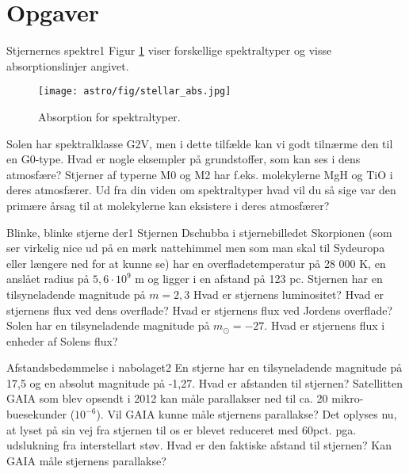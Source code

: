 \section{Opgaver}

\begin{opgave}{Stjernernes spektre}{1}
  Figur \ref{fig:stellar_abs} viser forskellige spektraltyper og visse
  absorptionslinjer angivet.
\begin{figure}[h]
	\centering
	\texttt{[image: astro/fig/stellar\_abs.jpg]}
	\caption{Absorption for spektraltyper.}
	\label{fig:stellar_abs}
\end{figure}
\opg Solen har spektralklasse G2V, men i dette tilfælde kan vi godt
tilnærme den til en G0-type. Hvad er nogle eksempler på grundstoffer,
som kan ses i dens atmosfære?  \opg Stjerner af typerne M0 og M2 har
f.eks. molekylerne MgH og TiO i deres atmosfærer. Ud fra din viden om
spektraltyper hvad vil du så sige var den primære årsag til at
molekylerne kan eksistere i deres atmosfærer?
\end{opgave}

\begin{opgave}{Blinke, blinke stjerne der}{1}
  Stjernen Dschubba i stjernebilledet Skorpionen (som ser virkelig
  nice ud på en mørk nattehimmel men som man skal til Sydeuropa eller
  længere ned for at kunne se) har en overfladetemperatur på 28 000 K,
  en anslået radius på $5,6 \cdot 10^9$ m og ligger i en afstand på
  123 pc. Stjernen har en tilsyneladende magnitude på $m=2,3$ \opg
  Hvad er stjernens luminositet?  \opg Hvad er stjernens flux ved dens
  overflade?  \opg Hvad er stjernens flux ved Jordens overflade?  \opg
  Solen har en tilsyneladende magnitude på $m_\odot=-27$. Hvad er
  stjernens flux i enheder af Solens flux?
\end{opgave}

\begin{opgave}{Afstandsbedømmelse i nabolaget}{2}
	En stjerne har en tilsyneladende magnitude på 17,5 og en absolut magnitude på -1,27.
	\opg Hvad er afstanden til stjernen? 
	\opg Satellitten GAIA som blev opsendt i 2012 kan måle parallakser ned til ca. 20 mikro-buesekunder ($10^{-6}$). Vil GAIA kunne måle stjernens parallakse?
	\opg Det oplyses nu, at lyset på sin vej fra stjernen til os er blevet reduceret med 60pct. pga. udslukning fra interstellart støv. Hvad er den faktiske afstand til stjernen? Kan GAIA måle stjernens parallakse? 
\end{opgave}

